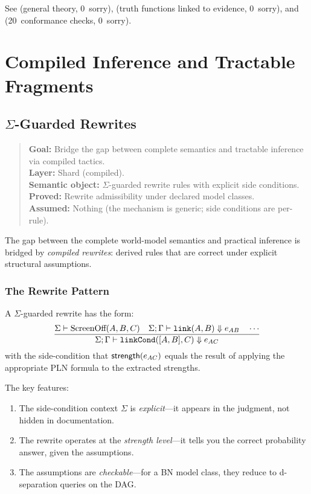 \documentclass[11pt,openany]{report}
\begin{document}
\noindent
See  (general
theory, 0~sorry),
 (truth
functions linked to evidence, 0~sorry), and
 (20~conformance
checks, 0~sorry).


\part{Compiled Inference and Tractable Fragments}
\label{part:compiled}

\chapter{\texorpdfstring{$\Sigma$}{Sigma}-Guarded Rewrites}
\label{ch:sigma-rewrites}

\begin{quote}\small
\textbf{Goal:} Bridge the gap between complete semantics and tractable inference via compiled tactics.\\
\textbf{Layer:} Shard (compiled).\\
\textbf{Semantic object:} $\Sigma$-guarded rewrite rules with explicit side conditions.\\
\textbf{Proved:} Rewrite admissibility under declared model classes.\\
\textbf{Assumed:} Nothing (the mechanism is generic; side conditions are per-rule).
\end{quote}

The gap between the complete world-model semantics and practical inference
is bridged by \emph{compiled rewrites}: derived rules that are correct
under explicit structural assumptions.

\section{The Rewrite Pattern}

A $\Sigma$-guarded rewrite has the form:
\[
\frac{\Sigma \vdash \text{ScreenOff}(A, B, C) \quad
      \Sigma; \Gamma \vdash \texttt{link}(A, B) \Downarrow e_{AB} \quad
      \cdots}
     {\Sigma; \Gamma \vdash \texttt{linkCond}([A, B], C) \Downarrow e_{AC}}
\]
with the side-condition that $\mathsf{strength}(e_{AC})$ equals the result of
applying the appropriate PLN formula to the extracted strengths.

The key features:
\begin{enumerate}
\item The side-condition context $\Sigma$ is \emph{explicit}---it appears
  in the judgment, not hidden in documentation.
\item The rewrite operates at the \emph{strength level}---it tells you
  the correct probability answer, given the assumptions.
\item The assumptions are \emph{checkable}---for a BN model class, they
  reduce to d-separation queries on the DAG.
\end{enumerate}
\end{document}
